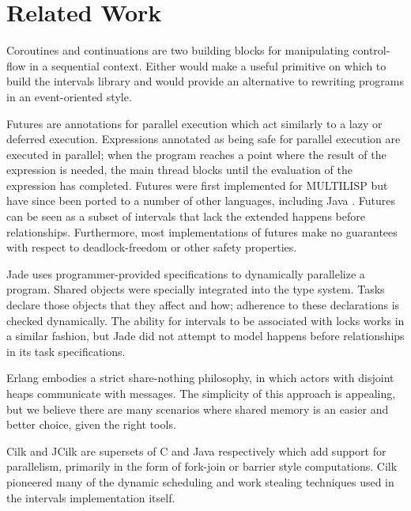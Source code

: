 
\chapter{Related Work}
\label{chap:queues-related-work}


Coroutines \cite{Conway1963} and continuations \cite{Reynolds1993} are
two building blocks for manipulating control-flow in a sequential
context. Either would make a useful primitive on which to build the
intervals library and would provide an alternative to rewriting
programs in an event-oriented style.

Futures are annotations for parallel execution which act similarly to
a lazy or deferred execution. Expressions annotated as being safe for
parallel execution are executed in parallel; when the program reaches
a point where the result of the expression is needed, the main thread
blocks until the evaluation of the expression has completed. Futures
were first implemented for MULTILISP \cite{Halstead1985} but have
since been ported to a number of other languages, including Java
\cite{Navabi2008}.  Futures can be seen as a subset of intervals that
lack the extended happens before relationships. Furthermore, most
implementations of futures make no guarantees with respect to
deadlock-freedom or other safety properties.

Jade \cite{Rinard1998} uses programmer-provided specifications to
dynamically parallelize a program. Shared objects were specially
integrated into the type system. Tasks declare those objects that they
affect and how; adherence to these declarations is checked
dynamically. The ability for intervals to be associated with locks
works in a similar fashion, but Jade did not attempt to model happens
before relationships in its task specifications.

Erlang \cite{Erlang2010} embodies a strict share-nothing philosophy,
in which actors with disjoint heaps communicate with messages. The
simplicity of this approach is appealing, but we believe there are
many scenarios where shared memory is an easier and better choice,
given the right tools.

Cilk \cite{Blumofe1995, Frigo1998} and JCilk \cite{Danaher2005} are
supersets of C and Java respectively which add support for
parallelism, primarily in the form of fork-join or barrier style
computations. Cilk pioneered many of the dynamic scheduling and work
stealing techniques used in the intervals implementation itself.


